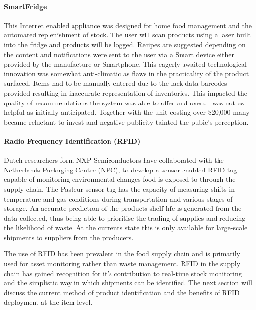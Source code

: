 \documentclass[a4paper, 11pt]{article}
\begin{document}
\paragraph{SmartFridge}
This Internet enabled appliance was designed for home food management and the automated replenishment of stock. The user will scan products using a laser built into the fridge and products will be logged. Recipes are suggested depending on the content and notifications were sent to the user via a Smart device either provided by the manufacture or Smartphone. This eagerly awaited technological innovation was somewhat anti-climatic as flaws in the practicality of the product surfaced. Items had to be manually entered due to the lack data barcodes provided resulting in inaccurate representation of inventories. This impacted the quality of recommendations the system was able to offer and overall was not as helpful as initially anticipated. Together with the unit costing over \$20,000 many became reluctant to invest and negative publicity tainted the pubic's perception.\cite{idiotFridge}

\paragraph{Radio Frequency Identification (RFID)}
Dutch researchers form NXP Semiconductors have collaborated with the Netherlands Packaging Centre (NPC),  to develop a sensor enabled RFID tag capable of monitoring environmental changes food is exposed to through the supply chain.\cite{rfidFood} The Pasteur sensor tag has the capacity of measuring shifts in temperature and gas conditions during transportation and various stages of storage. An accurate prediction of the products shelf life is generated from the data collected, thus being able to prioritise the trading of supplies and reducing the likelihood of waste. At the currents state this is only available for large-scale shipments to suppliers from the producers.

The use of RFID has been prevalent in the food supply chain and is primarily used for asset monitoring rather than waste management. RFID in the supply chain has gained recognition for it's contribution to real-time stock monitoring and the simplistic way in which shipments can be identified.\cite{RFID} The next section will discuss the current method of product identification and the benefits of RFID deployment at the item level.


\vspace{\baselineskip}
\vspace{\baselineskip}
\vspace{\baselineskip}
\end{document}
